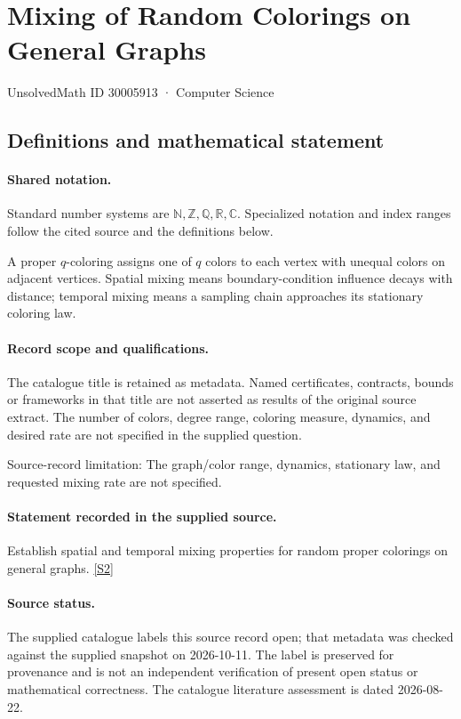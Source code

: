 \documentclass[11pt]{article}
\newcommand{\sref}[2]{\hyperlink{source:#1:#2}{[S#2]}}
\begin{document}
\setcounter{section}{30005912}
\section{Mixing of Random Colorings on General Graphs}\label{30005913}
{\small\sffamily UnsolvedMath ID 30005913 · Computer Science}
\subsection{Definitions and mathematical statement}

\paragraph{Shared notation.}Standard number systems are $\mathbb N,\mathbb Z,\mathbb Q,\mathbb R,\mathbb C$. Specialized notation and index ranges follow the cited source and the definitions below.


A proper $q$-coloring assigns one of $q$ colors to each vertex with unequal colors on adjacent vertices. Spatial mixing means boundary-condition influence decays with distance; temporal mixing means a sampling chain approaches its stationary coloring law.
\paragraph{Record scope and qualifications.}
The catalogue title is retained as metadata. Named certificates, contracts, bounds or frameworks in that title are not asserted as results of the original source extract.
The number of colors, degree range, coloring measure, dynamics, and desired rate are not specified in the supplied question.

Source-record limitation: The graph/color range, dynamics, stationary law, and requested mixing rate are not specified.
\paragraph{Statement recorded in the supplied source.}
Establish spatial and temporal mixing properties for random proper colorings on general graphs. \sref{30005913}{2}
\paragraph{Source status.}
The supplied catalogue labels this source record open; that metadata was checked against the supplied snapshot on 2026-10-11. The label is preserved for provenance and is not an independent verification of present open status or mathematical correctness. The catalogue literature assessment is dated 2026-08-22.
\end{document}
